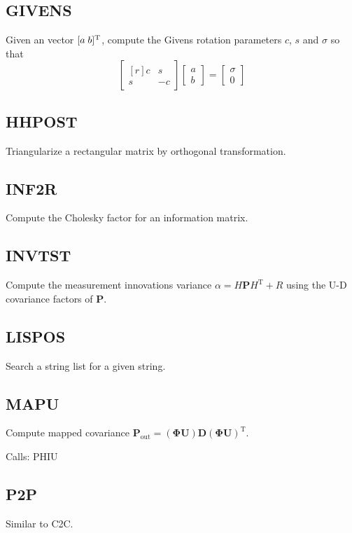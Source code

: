 \documentclass[./doc.tex]{subfiles}
\begin{document}
\subsection{GIVENS}
Given an vector \([a \thickspace b]^\textrm{T}\), compute the Givens rotation parameters \(c\), \(s\) and \(\sigma\) so that
\begin{equation}
    \begin{bmatrix*}[r]
        c & s \\
        s & -c
    \end{bmatrix*}
    \begin{bmatrix}
        a \\
        b
    \end{bmatrix} = \begin{bmatrix}
        \sigma \\
        0
    \end{bmatrix}
\end{equation}

\subsection{HHPOST}
Triangularize a rectangular matrix by orthogonal transformation.

\subsection{INF2R}
Compute the Cholesky factor for an information matrix.

\subsection{INVTST}
Compute the measurement innovations variance \( \alpha = H\bm{P}H^{\textrm{T}} + R\) using the
U-D covariance factors of \(\bm{P}\).

\subsection{LISPOS}
Search a string list for a given string.

\subsection{MAPU}
Compute mapped covariance \(\bm{P}_{\textrm{out}}=(\bm{\Phi}\bm{U})\bm{D}(\bm{\Phi}\bm{U})^{\textrm{T}}\).

Calls: PHIU

\subsection{P2P}
Similar to C2C.
\end{document}
